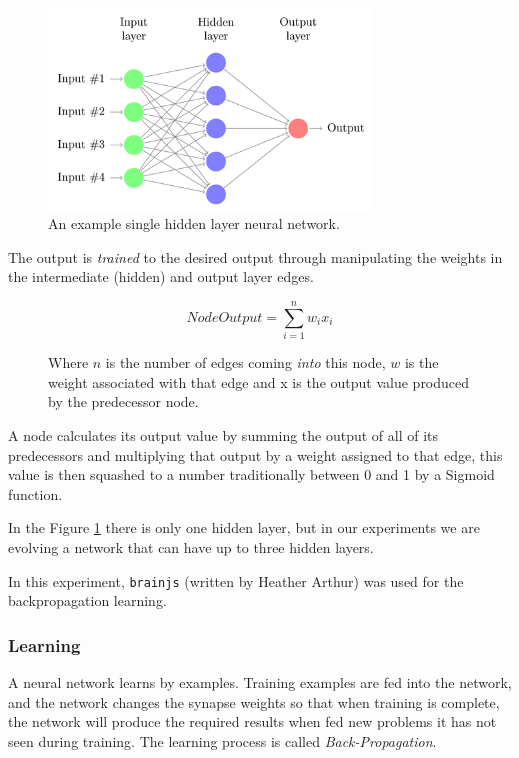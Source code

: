 \documentclass[journal]{IEEEtran}
\begin{document}
\begin{figure}[here]%
  \centering
  \includegraphics[width=3.4in]{neural-network}
  \caption{An example single hidden layer neural network.}
  \label{fig:NeuralNetwork}
\end{figure}

The output is \textit{trained} to the desired output through manipulating the weights in the
intermediate (hidden) and output layer edges.

\begin{figure}[here]
  \[  NodeOutput = \sum_{i=1}^{n} w_{i} x_{i} \]
  \caption{Where $n$ is the number of edges coming \textit{into} this node, $w$ is the weight
  associated with that edge and x is the output value produced by the predecessor node.}
  \label{fig:NodeOutput}
\end{figure}

A node calculates its output value by summing the output of all of its predecessors and multiplying
that output by a weight assigned to that edge, this value is then squashed to a number traditionally
between 0 and 1 by a Sigmoid function.

In the Figure \ref{fig:NeuralNetwork} there is only one hidden layer, but in our experiments we
are evolving a network that can have up to three hidden layers.

In this experiment, \texttt{brainjs} (written by Heather Arthur) was used for the backpropagation learning.\cite{brain}

\subsubsection*{Learning}
A neural network learns by examples. Training examples are fed into the network, and the network changes
the synapse weights so that when training is complete, the network will produce the required results when
fed new problems it has not seen during training. The learning process is called \textit{Back-Propagation}.\cite{slides}
\end{document}
